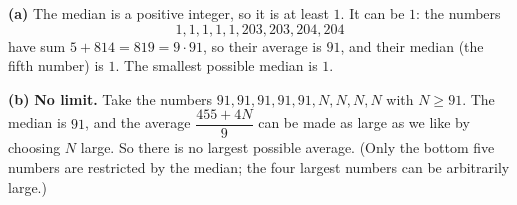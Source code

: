 \textbf{(a)} The median is a positive integer, so it is at least $1$. It can be $1$: the numbers
\[
1,1,1,1,1,203,203,204,204
\]
have sum $5+814=819=9\cdot91$, so their average is $91$, and their median (the fifth number) is $1$. The smallest possible median is $\boxed{1}$.

\textbf{(b)} \textbf{No limit.} Take the numbers $91,91,91,91,91,N,N,N,N$ with $N\ge91$. The median is $91$, and the average $\dfrac{455+4N}{9}$ can be made as large as we like by choosing $N$ large. So there is no largest possible average. (Only the bottom five numbers are restricted by the median; the four largest numbers can be arbitrarily large.)
